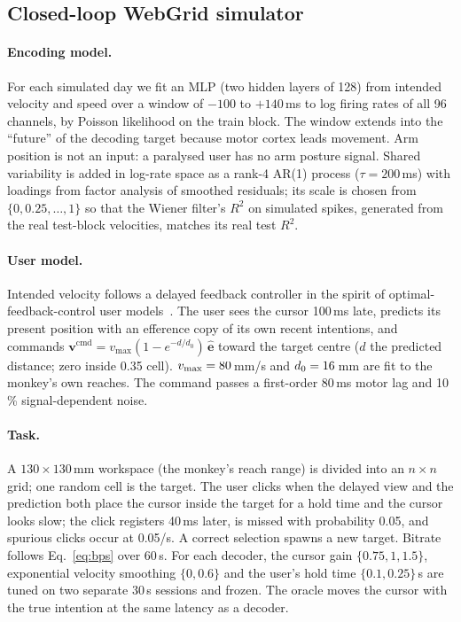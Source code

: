 \documentclass[10pt,twocolumn]{article}
\begin{document}
\subsection{Closed-loop WebGrid simulator}
\paragraph{Encoding model.} For each simulated day we fit an MLP (two hidden layers of 128)
from intended velocity and speed over a window of $-100$ to $+140$\,ms to log firing rates of
all 96 channels, by Poisson likelihood on the train block. The window extends into the
``future'' of the decoding target because motor cortex leads movement. Arm position is not an
input: a paralysed user has no arm posture signal. Shared variability is added in log-rate
space as a rank-4 AR(1) process ($\tau=200$\,ms) with loadings from factor analysis of
smoothed residuals; its scale is chosen from $\{0,0.25,\dots,1\}$ so that the Wiener filter's
$R^2$ on simulated spikes, generated from the real test-block velocities, matches its real
test $R^2$.

\paragraph{User model.} Intended velocity follows a delayed feedback controller in the
spirit of optimal-feedback-control user models~\cite{willett2019principled}. The user sees the
cursor 100\,ms late, predicts its present position with an efference copy of its own recent
intentions, and commands $\mathbf{v}^{\mathrm{cmd}} = v_{\max}(1-e^{-d/d_0})\,\hat{\mathbf{e}}$
toward the target centre ($d$ the predicted distance; zero inside 0.35 cell). $v_{\max}=80$\,mm/s
and $d_0=16$\,mm are fit to the monkey's own reaches. The command passes a first-order
80\,ms motor lag and 10\,\% signal-dependent noise.

\paragraph{Task.} A $130\times130$\,mm workspace (the monkey's reach range) is divided into an
$n\times n$ grid; one random cell is the target. The user clicks when the delayed view and the
prediction both place the cursor inside the target for a hold time and the cursor looks slow;
the click registers 40\,ms later, is missed with probability 0.05, and spurious clicks occur at
0.05/s. A correct selection spawns a new target. Bitrate follows Eq.~\ref{eq:bps} over 60\,s.
For each decoder, the cursor gain $\{0.75,1,1.5\}$, exponential velocity smoothing $\{0,0.6\}$ and
the user's hold time $\{0.1,0.25\}$\,s are tuned on two separate 30\,s sessions and frozen.
The oracle moves the cursor with the true intention at the same latency as a decoder.
\end{document}
